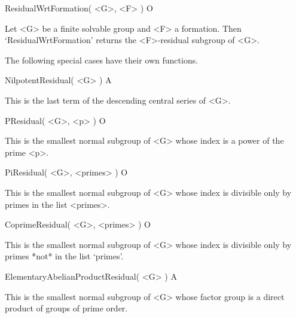 

\bigskip

\> ResidualWrtFormation( <G>, <F> ) O

Let <G> be a finite solvable group and <F> a formation. Then
`ResidualWrtFormation' returns the <F>-residual subgroup of <G>.   

The following special cases have their own functions.

\bigskip

\> NilpotentResidual( <G> ) A

This is the last term of the descending central series of <G>.

\> PResidual( <G>, <p> ) O

This is the smallest normal subgroup of <G> whose index is a power of 
the prime <p>.  

\> PiResidual( <G>, <primes> ) O

This is the smallest normal subgroup of <G> whose index is divisible 
only by primes in the list <primes>.

\> CoprimeResidual( <G>, <primes> ) O

This is the smallest normal subgroup of <G> whose index is
divisible only by primes *not* in the list `primes'.

\> ElementaryAbelianProductResidual( <G> ) A

This is the smallest normal subgroup of <G> whose factor group is a
direct product of groups of prime order.


